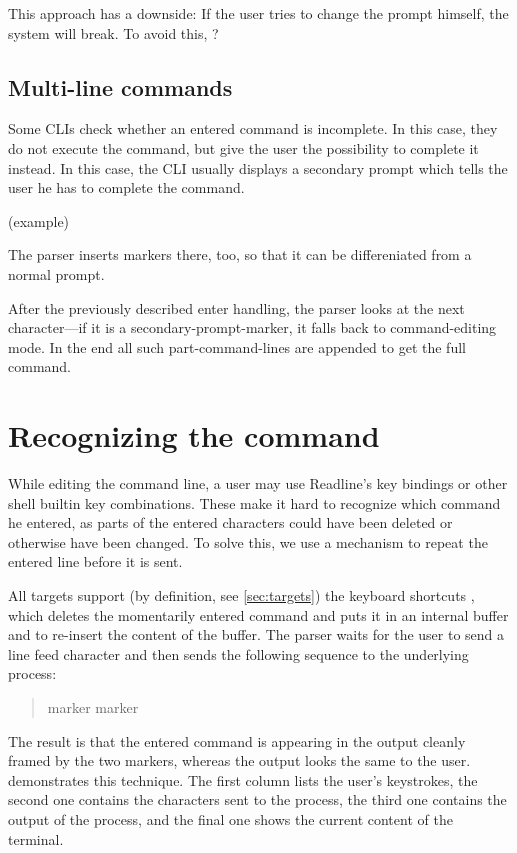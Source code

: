 \documentclass[paper=a4,twoside,abstract=on,cleardoublepage=empty,numbers=noenddot,toc=bib,12pt,appendixprefix=true]{scrreprt}
\begin{document}
This approach has a downside: If the user tries to change the prompt himself, the system will break. To avoid this, ?

\subsection*{Multi-line commands}

Some \textsc{CLI}s check whether an entered command is incomplete. In this case, they do not execute the command, but give the user the possibility to complete it instead. In this case, the CLI usually displays a secondary prompt which tells the user he has to complete the command.

(example)

The parser inserts markers there, too, so that it can be differeniated from a normal prompt.

After the previously described enter handling, the parser looks at the next character---if it is a secondary-prompt-marker, it falls back to command-editing mode. In the end all such part-command-lines are appended to get the full command.

\section{Recognizing the command}

While editing the command line, a user may use Readline's key bindings or other shell builtin key combinations. These make it hard to recognize which command he entered, as parts of the entered characters could have been deleted or otherwise have been changed. To solve this, we use a mechanism to repeat the entered line before it is sent.

All targets support (by definition, see \cref{sec:targets}) the keyboard shortcuts , which deletes the momentarily entered command and puts it in an internal buffer and  to re-insert the content of the buffer. The parser waits for the user to send a line feed character and then sends the following sequence to the underlying process:

\begin{quote}
     marker   marker  \keys{\return}
\end{quote}

The result is that the entered command is appearing in the output cleanly framed by the two markers, whereas the output looks the same to the user.  demonstrates this technique. The first column lists the user's keystrokes, the second one contains the characters sent to the process, the third one contains the output of the process, and the final one shows the current content of the terminal.
\end{document}
